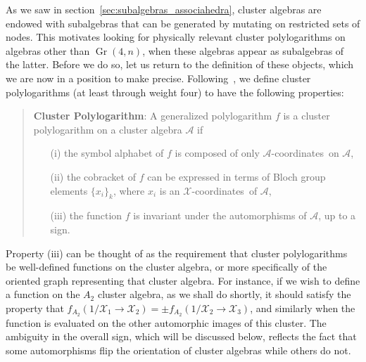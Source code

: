 \documentclass[12pt]{article}
\DeclareMathOperator{\Gr}{Gr}
\def\x{\mathcal{X}}
\def\xcoords{$\mathcal{X}$-coordinates}
\def\a{\mathcal{A}}
\def\acoords{$\mathcal{A}$-coordinates}
\begin{document}
As we saw in section~\ref{sec:subalgebras_associahedra}, cluster algebras are endowed with subalgebras that can be generated by mutating on restricted sets of nodes. This motivates looking for physically relevant cluster polylogarithms on algebras other than $\Gr(4,n)$, when these algebras appear as subalgebras of the latter. Before we do so, let us return to the definition of these objects, which we are now in a position to make precise. Following~\cite{Golden:2014xqa}, we define cluster polylogarithms (at least through weight four) to have the following properties:
\begin{quote}
{\bf Cluster Polylogarithm}: A generalized polylogarithm $f$ is a cluster polylogarithm on a cluster algebra $\a$ if
\vspace{-.2cm}
 \begin{itemize}
 \item[(i)] the symbol alphabet of $f$ is composed of only \acoords\ on $\a$, 
 \item[(ii)] the cobracket of $f$ can be expressed in terms of Bloch group elements $\{x_i \}_k$, where $x_i$ is an \xcoords\ of $\a$,
 \item[(iii)] the function $f$ is invariant under the automorphisms of $\a$, up to a sign.
 \end{itemize}
\end{quote}
Property (iii) can be thought of as the requirement that cluster polylogarithms be well-defined functions on the cluster algebra, or more specifically of the oriented graph representing that cluster algebra. For instance, if we wish to define a function on the $A_2$ cluster algebra, as we shall do shortly, it should satisfy the property that $f_{A_2}(1/\x_1\to\x_2)=\pm f_{A_2}(1/\x_2\to\x_3)$, and similarly when the function is evaluated on the other automorphic images of this cluster. The ambiguity in the overall sign, which will be discussed below, reflects the fact that some automorphisms flip the orientation of cluster algebras while others do not.
\end{document}
